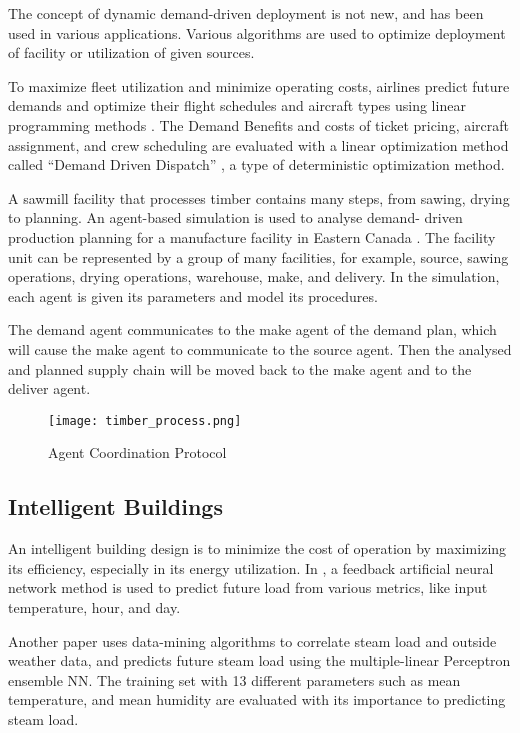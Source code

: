 The concept of dynamic demand-driven deployment is not new,
and has been used in various applications. Various algorithms
are used to optimize deployment of facility or utilization
of given sources.

To maximize fleet utilization and minimize
operating costs, airlines predict future demands
and optimize their flight schedules and aircraft
types using linear programming methods \cite{berge_demand_1993}. The Demand
Benefits and costs of ticket pricing, aircraft assignment, and crew 
scheduling are evaluated with a linear optimization method called
 ``Demand Driven Dispatch'' \cite{shebalov_practical_2009}, a type
of deterministic optimization method.

A sawmill facility that processes timber contains 
many steps, from sawing, drying to planning. An
agent-based simulation is used to analyse demand-
driven production planning for a manufacture facility
in Eastern Canada \cite{yáñez_agent-based_2009}.
The facility unit can be represented by a group of many facilities,
for example, source, sawing operations, drying operations, warehouse,
make, and delivery. In the simulation, each agent is given its parameters
and model its procedures.

The demand agent communicates to the make agent of the demand plan,
which will cause the make agent to communicate to the source agent. Then the
analysed and planned supply chain will be moved back to the make agent and
to the deliver agent.

\begin{figure}
	\texttt{[image: timber\_process.png]}
	\caption{Agent Coordination Protocol \cite{yáñez_agent-based_2009} } 
	\label{fig:timber_process}
\end{figure}


\subsection{Intelligent Buildings}
An intelligent building design is to minimize 
the cost of operation by maximizing its efficiency,
especially in its energy utilization. In 
\cite{gonzález_prediction_2005}, a feedback artificial neural
network method is used to predict future load from various
metrics, like input temperature, hour, and day.

Another paper \cite{kusiak_a_2010} uses data-mining algorithms
to correlate steam load and outside weather data, and predicts
future steam load using the multiple-linear Perceptron ensemble
NN. The training set with 13 different parameters such as mean temperature,
and mean humidity are evaluated with its importance to predicting steam load.


